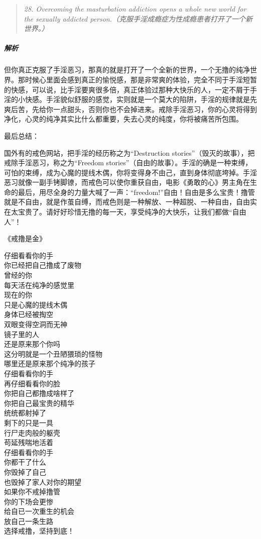 \begin{quote}\it
    28. Overcoming the masturbation addiction opens a whole new world for the sexually addicted person.（克服手淫成瘾症为性成瘾患者打开了一个新世界。）
\end{quote}

\subparagraph{解析} 但你真正克服了手淫恶习，那真的就是打开了一个全新的世界，一个无撸的纯净世界。那时候心里面会感到真正的愉悦感，那是非常爽的体验，完全不同于手淫短暂的快感，可以说，比手淫要爽很多倍，真正体验过那种大快乐的人，一定不屑于手淫的小快感。手淫貌似舒服的感觉，实则就是一个莫大的陷阱，手淫的规律就是先爽后苦，先给你一点甜头，否则你也不会掉进来。戒除手淫恶习，你的心灵将得到净化，心灵的纯净其实比什么都重要，失去心灵的纯度，你将被痛苦所包围。

最后总结：

国外有的戒色网站，把手淫的经历称之为“Destruction stories”（毁灭的故事），把戒除手淫恶习，称之为“Freedom stories”（自由的故事）。手淫的确是一种束缚，可怕的束缚，成为心魔的提线木偶，你将变得身不由己，直到身体彻底垮掉。手淫恶习就像一副手铐脚镣，而戒色可以使你重获自由，电影《勇敢的心》男主角在生命的最后，用尽全身的力量大喊了一声：“freedom!”自由！自由是多么宝贵！撸管就是不自由，就是作茧自缚，而戒色则是一种解放、一种超脱、一种自由，自由实在太宝贵了。请好好珍惜无撸的每一天，享受纯净的大快乐，让我们都做“自由人”！

\begin{center}
    《戒撸是金》\it
    \begin{multicols}{2}
        仔细看看你的手 \\ 你已经把自己撸成了废物 \\ 曾经的你 \\ 每天活在纯净的感觉里 \\ 现在的你 \\ 只是心魔的提线木偶 \\ 身体已经被掏空 \\ 双眼变得空洞而无神 \\ 镜子里的人 \\ 还是原来那个你吗 \\ 这分明就是一个丑陋猥琐的怪物 \\ 哪里还是原来那个纯净的孩子 \\ 仔细看看你的手 \\ 再仔细看看你的脸 \\ 你把自己都撸成啥样了 \\ 你把自己最宝贵的精华 \\ 统统都射掉了 \\ 剩下的只是一具 \\ 行尸走肉般的躯壳 \\ 苟延残喘地活着 \\ 仔细看看你的手 \\ 你都干了什么 \\ 你毁掉了自己 \\ 也毁掉了家人对你的期望 \\ 如果你不戒掉撸管 \\ 你的下场会更惨 \\ 给自已一次重生的机会 \\ 放自己一条生路 \\ 选择戒撸，坚持到底！
    \end{multicols}
\end{center}
